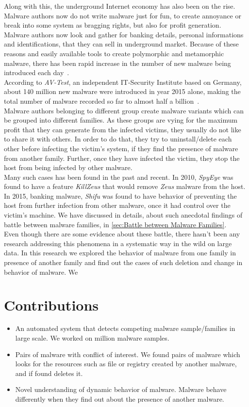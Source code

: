 Along with this, the underground Internet economy has also been on the rise.
Malware authors now do not write malware just for fun, to create annoyance or break into some system as bragging rights, but also for profit generation.
Malware authors now look and gather for banking details, personal informations and identifications, that they can sell in underground market.
Because of these reasons and easily available tools to create polymorphic and metamorphic malware, there has been rapid increase in the number of new malware being introduced each day~\cite[]{tian}.\\
According to \emph{AV-Test}, an independent IT-Security Institute based on Germany, about 140 million new malware were introduced in year 2015 alone, making the total number of malware recorded so far to almost half a billion~\cite[]{avtest}.\\
Malware authors belonging to different group create malware variants which can be grouped into different families.
As these groups are vying for the maximum profit that they can generate from the infected victims, they usually do not like to share it with others.
In order to do that, they try to uninstall/delete each other before infecting the victim's system, if they find the presence of malware from another family.
Further, once they have infected the victim, they stop the host from being infected by other malware.\\
Many such cases has been found in the past and recent.
In 2010, \emph{SpyEye} was found to have a feature \emph{KillZeus} that would remove \emph{Zeus} malware from the host.
In 2015, banking malware, \emph{Shifu} was found to have behavior of preventing the host from further infection from other malware, once it had control over the victim's machine.
We have discussed in details, about such anecdotal findings of battle between malware families, in \autoref{sec:Battle between Malware Families}.\\
Even though there are some evidence about these battle, there hasn't been any research addressing this phenomena in a systematic way in the wild on large data.
In this research we explored the behavior of malware from one family in presence of another family and find out the cases of such deletion and change in behavior of malware.
We 
\section{Contributions}
\label{sec:Contributions}
\begin{itemize}
  \item An automated system that detects competing malware sample/families in large scale. We worked on {\gettotalmalwareii{}} million malware samples.
  \item Pairs of malware with conflict of interest. We found pairs of malware which looks for the resources such as file or registry created by another malware, and if found deletes it.
  \item Novel understanding of dynamic behavior of malware. Malware behave differently when they find out about the presence of another malware.
\end{itemize}
